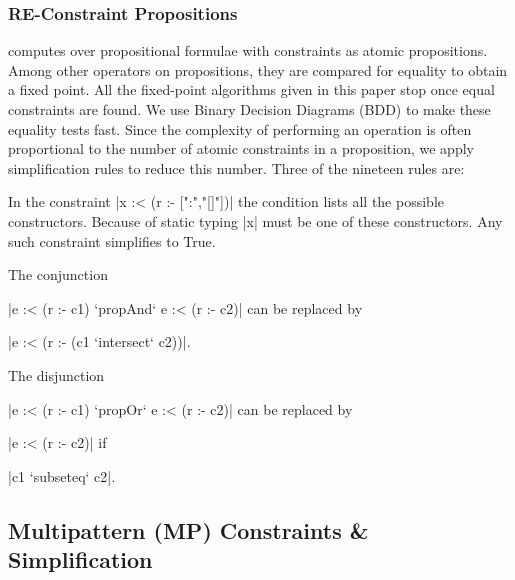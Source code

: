\subsubsection{RE-Constraint Propositions}
\label{sec:re-propositions}

\catch{} computes over propositional formulae with constraints as atomic propositions. Among other operators on propositions, they are compared for equality to obtain a fixed point. All the fixed-point algorithms given in this paper stop once equal constraints are found. We use Binary Decision Diagrams (BDD) \citep{lee:bdd} to make these equality tests fast. Since the complexity of performing an operation is often proportional to the number of atomic constraints in a proposition, we apply simplification rules to reduce this number. Three of the nineteen rules are:

 In the constraint |x :< (r :- [":","[]"])| the condition lists all the possible constructors. Because of static typing |x| must be one of these constructors. Any such constraint simplifies to True.

 The conjunction \ignore|e :< (r :- c1) `propAnd` e :< (r :- c2)| can be replaced by \ignore|e :< (r :- (c1 `intersect` c2))|.

 The disjunction \ignore|e :< (r :- c1) `propOr` e :< (r :- c2)| can be replaced by \ignore|e :< (r :- c2)| if \ignore|c1 `subseteq` c2|.


\subsection{Multipattern (MP) Constraints \& Simplification}
\label{sec:multipattern}

